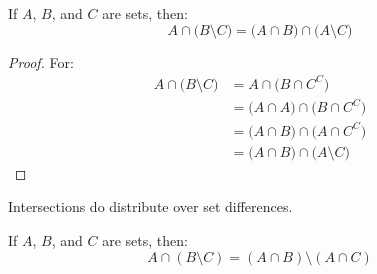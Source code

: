             \begin{theorem}
                If $A$, $B$, and $C$ are sets, then:
                \begin{equation}
                    A\cap\big(B\setminus{C}\big)
                    =\big(A\cap{B}\big)\cap\big(A\setminus{C}\big)
                \end{equation}
            \end{theorem}
            \begin{proof}
                For:
                \begin{subequations}
                    \begin{align}
                        A\cap\big(B\setminus{C}\big)
                        &=A\cap\big(B\cap{C}^{C}\big)\\
                        &=\big(A\cap{A}\big)
                            \cap\big(B\cap{C}^{C}\big)\\
                        &=\big(A\cap{B}\big)
                            \cap\big(A\cap{C}^{C}\big)\\
                        &=\big(A\cap{B}\big)
                            \cap\big(A\setminus{C}\big)
                    \end{align}
                \end{subequations}
            \end{proof}
            Intersections do distribute over set differences.
            \begin{theorem}
                If $A$, $B$, and $C$ are sets, then:
                \begin{equation}
                    A\cap(B\setminus{C})=
                    (A\cap{B})\setminus(A\cap{C})
                \end{equation}
            \end{theorem}
